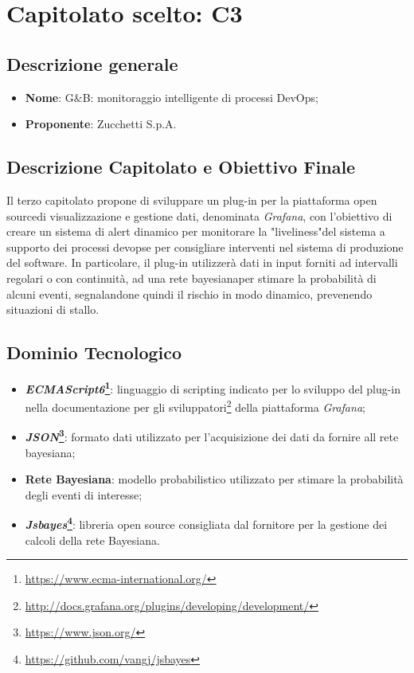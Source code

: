 \section{Capitolato scelto: C3}\label{CapScelto}

\subsection{Descrizione generale}
\begin{itemize}
	\item \textbf{Nome}: G$\&$B: monitoraggio intelligente di processi DevOps;
	\item \textbf{Proponente}: Zucchetti S.p.A.
\end{itemize}

\subsection{Descrizione Capitolato e Obiettivo Finale}
Il terzo capitolato propone di sviluppare un plug-in per la piattaforma open source\glossario di visualizzazione e gestione dati, denominata \textit{Grafana}, con l'obiettivo di creare un sistema di alert dinamico per monitorare la "liveliness"\glossario del sistema a supporto dei processi
devops\glossario e per consigliare interventi nel sistema di produzione del software.
In particolare, il plug-in utilizzerà dati in input forniti ad intervalli regolari o con continuità, ad una rete bayesiana\glossario per stimare la probabilità di alcuni eventi, segnalandone quindi il rischio in modo dinamico, prevenendo situazioni di stallo.   

\subsection{Dominio Tecnologico}
\begin{itemize}
	\item \textbf{\textit{ECMAScript6}\footnote{\url{https://www.ecma-international.org/}}\glossario}: linguaggio di scripting indicato per lo sviluppo del plug-in nella documentazione per gli sviluppatori\footnote{\url{http://docs.grafana.org/plugins/developing/development/}} della piattaforma \textit{Grafana};
	\item \textbf{\textit{JSON}\footnote{\url{https://www.json.org/}}\glossario}: formato dati utilizzato per l'acquisizione dei dati da fornire all rete bayesiana;
	\item \textbf{Rete Bayesiana}: modello probabilistico utilizzato per stimare la probabilità degli eventi di interesse;
	\item \textbf{\textit{Jsbayes}\footnote{\hyperref[Link al repository GitHub]{\url{https://github.com/vangj/jsbayes}}}\glossario}: libreria open source consigliata dal fornitore per la gestione dei calcoli della rete Bayesiana.
\end{itemize}

